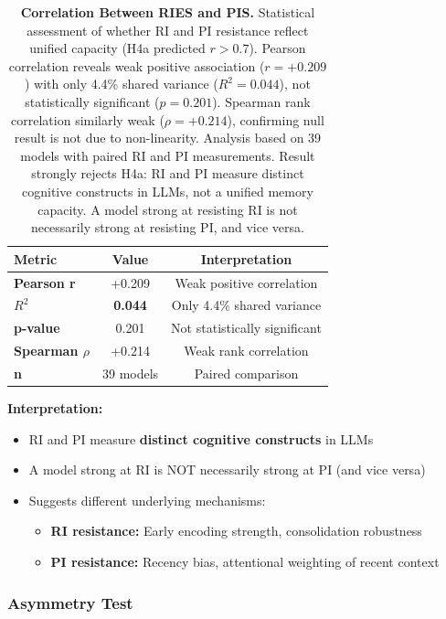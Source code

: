 \documentclass{article}
\begin{document}
\begin{table}[t]
\centering
\caption{\textbf{Correlation Between RIES and PIS.}
Statistical assessment of whether RI and PI resistance reflect unified capacity (H4a predicted $r > 0.7$).
Pearson correlation reveals weak positive association ($r = +0.209$) with only 4.4\% shared variance ($R^2 = 0.044$), not statistically significant ($p = 0.201$).
Spearman rank correlation similarly weak ($\rho = +0.214$), confirming null result is not due to non-linearity.
Analysis based on 39 models with paired RI and PI measurements.
Result strongly rejects H4a: RI and PI measure distinct cognitive constructs in LLMs, not a unified memory capacity.
A model strong at resisting RI is not necessarily strong at resisting PI, and vice versa.}
\begin{tabular}{lcc}
\toprule
Metric & Value & Interpretation \\
\midrule
\textbf{Pearson r} & +0.209 & Weak positive correlation \\
\textbf{$R^2$} & \textbf{0.044} & Only 4.4\% shared variance \\
\textbf{p-value} & 0.201 & Not statistically significant \\
\textbf{Spearman $\rho$} & +0.214 & Weak rank correlation \\
\textbf{n} & 39 models & Paired comparison \\
\bottomrule
\end{tabular}
\end{table}

\textbf{Interpretation:}
\begin{itemize}[itemsep=2pt,topsep=3pt,parsep=0pt]
    \item RI and PI measure \textbf{distinct cognitive constructs} in LLMs
    \item A model strong at RI is NOT necessarily strong at PI (and vice versa)
    \item Suggests different underlying mechanisms:
    \begin{itemize}[itemsep=2pt,topsep=3pt,parsep=0pt]
        \item \textbf{RI resistance:} Early encoding strength, consolidation robustness
        \item \textbf{PI resistance:} Recency bias, attentional weighting of recent context
    \end{itemize}
\end{itemize}

\subsubsection{Asymmetry Test}
\end{document}
